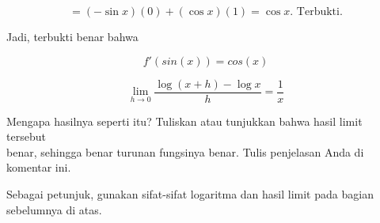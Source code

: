 \documentclass{article}
\begin{document}
\begin{eulernotebook}
\begin{eulercomment}
\begin{eulercomment}
\begin{eulercomment}
\begin{eulercomment}
\begin{eulercomment}
\end{eulercomment}
\begin{eulerformula}
\[
\text{$=(-\sin x)(0)+(\cos x)(1)=\cos x$. Terbukti.}
\]
\end{eulerformula}
\begin{eulercomment}
Jadi, terbukti benar bahwa\\
\end{eulercomment}
\begin{eulerformula}
\[
f'(sin(x))=cos(x)
\]
\end{eulerformula}
\eulersubheading{}
\begin{eulerformula}
\[
\lim_{h\rightarrow 0}{\frac{\log \left(x+h\right)-\log x}{h}}=  \frac{1}{x}
\]
\end{eulerformula}
\begin{eulercomment}
Mengapa hasilnya seperti itu? Tuliskan atau tunjukkan bahwa hasil
limit tersebut\\
benar, sehingga benar turunan fungsinya benar.  Tulis penjelasan Anda
di komentar ini.

Sebagai petunjuk, gunakan sifat-sifat logaritma dan hasil limit pada
bagian sebelumnya di atas.


\end{eulercomment}
\end{eulercomment}
\end{eulercomment}
\end{eulercomment}
\end{eulercomment}
\end{eulernotebook}
\end{document}
